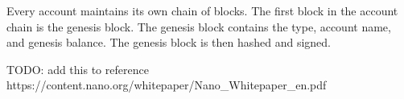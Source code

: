 \documentclass{report}
\begin{document}
Every account maintains its own chain of blocks. The first block in the account
chain is the genesis block. The genesis block contains the type, account name,
and genesis balance. The genesis block is then hashed and signed.



TODO: add this to reference\newline
https://content.nano.org/whitepaper/Nano\_Whitepaper\_en.pdf
\end{document}
